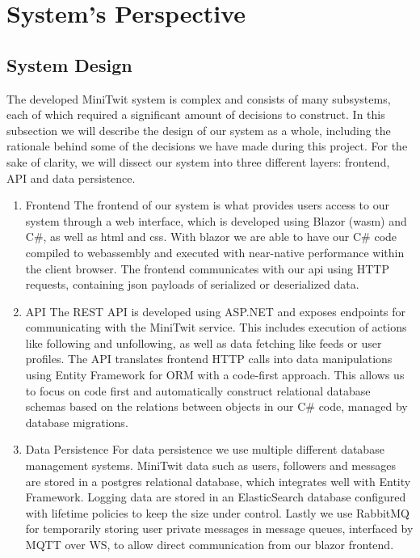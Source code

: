 \section{System's Perspective}
  \subsection{System Design}
  The developed MiniTwit system is complex and consists of many subsystems, each of which required a significant amount of decisions to construct.
  In this subsection we will describe the design of our system as a whole, including the rationale behind some of the decisions we have made during this project.
  \newline
  For the sake of clarity, we will dissect our system into three different layers: frontend, API and data persistence.
  \begin{enumerate}
    \item Frontend\newline
    The frontend of our system is what provides users access to our system through a web interface, which is developed using Blazor (wasm) and C\#, as well as html and css.
    With blazor we are able to have our C\# code compiled to webassembly and executed with near-native performance within the client browser.
    The frontend communicates with our api using HTTP requests, containing json payloads of serialized or deserialized data.
    
    \item API\newline
    The REST API is developed using ASP.NET and exposes endpoints for communicating with the MiniTwit service. 
    This includes execution of actions like following and unfollowing, as well as data fetching like feeds or user profiles.
    The API translates frontend HTTP calls into data manipulations using Entity Framework for ORM with a code-first approach.
    This allows us to focus on code first and automatically construct relational database schemas based on the relations between objects in our C\# code, managed by database migrations.
    
    \item Data Persistence\newline
    For data persistence we use multiple different database management systems. 
    MiniTwit data such as users, followers and messages are stored in a postgres relational database, which integrates well with Entity Framework.
    Logging data are stored in an ElasticSearch database configured with lifetime policies to keep the size under control.
    Lastly we use RabbitMQ for temporarily storing user private messages in message queues, interfaced by MQTT over WS, to allow direct communication from our blazor frontend.
    

  \end{enumerate}

